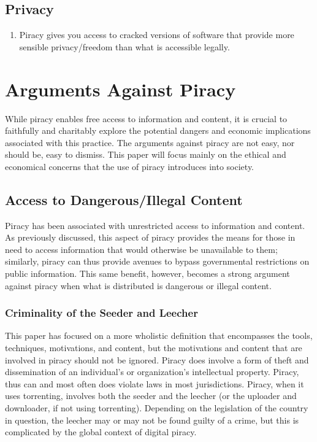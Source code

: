 \documentclass[onecolumn, 12pt]{article}
\begin{document}
\subsection{Privacy}

\begin{enumerate}
  \item Piracy gives you access to cracked versions of software that provide
    more sensible privacy/freedom than what is accessible
    legally.~\cite{stallman:right-to-read}
\end{enumerate}

\section{Arguments Against Piracy}
While piracy enables free access to information and content, it is crucial to
faithfully and charitably explore the potential dangers and economic
implications associated with this practice. The arguments against piracy are
not easy, nor should be, easy to dismiss. This paper will focus mainly on the
ethical and economical concerns that the use of piracy introduces into society.

\subsection{Access to Dangerous/Illegal Content}
Piracy has been associated with unrestricted access to information and
content. As previously discussed, this aspect of piracy provides the means for
those in need to access information that would otherwise be unavailable to them;
similarly, piracy can thus provide avenues to bypass governmental restrictions
on public information. This same benefit, however, becomes a strong argument
against piracy when what is distributed is dangerous or illegal content.

\subsubsection{Criminality of the Seeder and Leecher}
This paper has focused on a more wholistic definition that encompasses
the tools, techniques, motivations, and content, but the motivations and
content that are involved in piracy should not be ignored. Piracy does involve
a form of theft and dissemination of an individual's or organization's
intellectual property. Piracy, thus can and most often does violate laws in
most jurisdictions. Piracy, when it uses torrenting, involves both the
seeder and the leecher (or the uploader and downloader, if not using torrenting).
Depending on the legislation of the country in question, the leecher may or
may not be found guilty of a crime, but this is complicated by the global
context of digital piracy.
\end{document}
